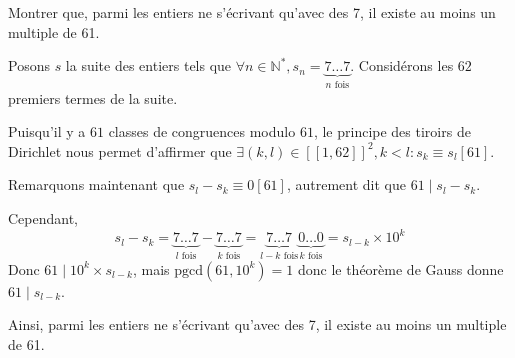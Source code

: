 \documentclass{article}
\begin{document}
    \begin{question_kholle}{Montrer que, parmi les entiers ne s'écrivant qu'avec des 7, il existe au moins un multiple de 61.}
        
        Posons $s$ la suite des entiers tels que $\forall n \in \mathbb{N}^{*}, s_{n} = \underbrace{ 7\dots 7 }_{ n \text{ fois} }$.
        Considérons les $62$ premiers termes de la suite.
        
        Puisqu'il y a $61$ classes de congruences modulo $61$, le principe des tiroirs de Dirichlet nous permet d'affirmer que $\exists (k, l) \in [ \! [ 1, 62 ] \!]^{2}, k < l:s_{k} \equiv s_{l}[61]$.
        
        Remarquons maintenant que $s_{l}-s_{k} \equiv 0 [61]$, autrement dit que $61\mid s_{l} - s_{k}$.
        
        Cependant, $$
        s_{l} - s_{k} = \underbrace{ 7\dots7 }_{ l \text{ fois} } - \underbrace{ 7 \dots 7 }_{ k \text{ fois} } = \underbrace{ 7 \dots 7 }_{ l-k \text{ fois} } \underbrace{ 0 \dots 0 }_{ k \text{ fois} } = s_{l-k} \times 10^{k}
        $$
        Donc $61 \mid 10^{k} \times s_{l-k}$, mais $\mathrm{pgcd}(61, 10^{k}) = 1$ donc le théorème de Gauss donne $61\mid s_{l-k}$.
        
        Ainsi, parmi les entiers ne s'écrivant qu'avec des 7, il existe au moins un multiple de 61.
    \end{question_kholle}
    
\end{document}
